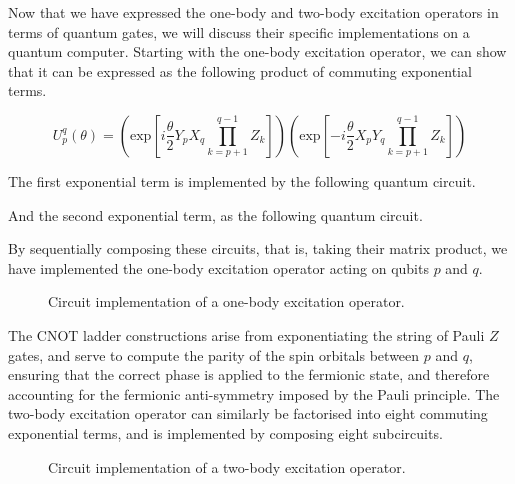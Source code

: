 Now that we have expressed the one-body and two-body excitation operators in terms of quantum gates, we will discuss their specific implementations on a quantum computer. Starting with the one-body excitation operator, we can show that it can be expressed as the following product of commuting exponential terms.

\begin{equation*}
    U^q_p (\theta) =
    \left( \text{exp} \left[
    i \frac{\theta}{2} Y_p X_q \prod_{k=p+1}^{q-1} Z_k \right] \right)
    \left( \text{exp} \left[ -
    i \frac{\theta}{2} X_p Y_q \prod_{k=p+1}^{q-1} Z_k \right] \right)
\end{equation*}

The first exponential term is implemented by the following quantum circuit.


And the second exponential term, as the following quantum circuit.


By sequentially composing these circuits, that is, taking their matrix product, we have implemented the one-body excitation operator acting on qubits $p$ and $q$.

\begin{figure}[H]
    \centering
    \caption{Circuit implementation of a one-body excitation operator.}
    \label{one-body-implementation}
\end{figure}

The CNOT ladder constructions arise from exponentiating the string of Pauli $Z$ gates, and serve to compute the parity of the spin orbitals between $p$ and $q$, ensuring that the correct phase is applied to the fermionic state, and therefore accounting for the fermionic anti-symmetry imposed by the Pauli principle. The two-body excitation operator can similarly be factorised into eight commuting exponential terms, and is implemented by composing eight subcircuits.

\begin{figure}[H]
    \centering
    \caption{Circuit implementation of a two-body excitation operator.}
    \label{two-body-implementation}
\end{figure}

